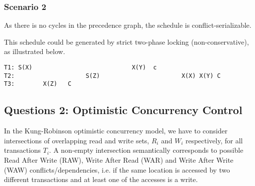 \documentclass[11pt,a4paper,english]{article}
\begin{document}
\subsubsection{Scenario 2}


\begin{figure}[H]
\centering
{}
\end{figure}


As there is no cycles in the precedence graph, the schedule is conflict-serializable.

This schedule could be generated by strict two-phase locking (non-conservative),
as illustrated below.

\begin{verbatim}
T1: S(X)                            X(Y)  c
T2:                    S(Z)                       X(X) X(Y) C
T3:        X(Z)   C
\end{verbatim}

\subsection{Questions 2: Optimistic Concurrency Control}
In the Kung-Robinson optimistic concurrency model, we have to consider
intersections of overlapping read and write sets, $R_{i}$ and $W_{i}$
respectively, for all transactions $T_{i}$. A non-empty intersection
semantically corresponds to possible Read After Write (RAW), Write After Read
(WAR) and Write After Write (WAW) conflicts/dependencies, i.e. if the same
location is accessed by two different transactions and at least one of the
accesses is a write.
\end{document}
